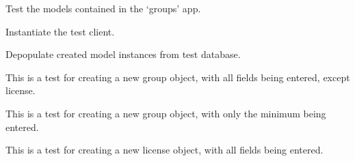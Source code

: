 \documentclass[letterpaper,10pt,english]{sphinxmanual}
\begin{document}
\begin{fulllineitems}
\label{groups:mousedb.groups.tests.GroupsModelTests}
Test the models contained in the `groups' app.

\begin{fulllineitems}
\label{groups:mousedb.groups.tests.GroupsModelTests.setUp}
Instantiate the test client.

\end{fulllineitems}


\begin{fulllineitems}
\label{groups:mousedb.groups.tests.GroupsModelTests.tearDown}
Depopulate created model instances from test database.

\end{fulllineitems}


\begin{fulllineitems}
\label{groups:mousedb.groups.tests.GroupsModelTests.test_create_group_all_fields}
This is a test for creating a new group object, with all fields being entered, except license.

\end{fulllineitems}


\begin{fulllineitems}
\label{groups:mousedb.groups.tests.GroupsModelTests.test_create_group_minimal}
This is a test for creating a new group object, with only the minimum being entered.

\end{fulllineitems}


\begin{fulllineitems}
\label{groups:mousedb.groups.tests.GroupsModelTests.test_create_license_all_fields}
This is a test for creating a new license object, with all fields being entered.


\end{fulllineitems}
\end{fulllineitems}
\end{document}
